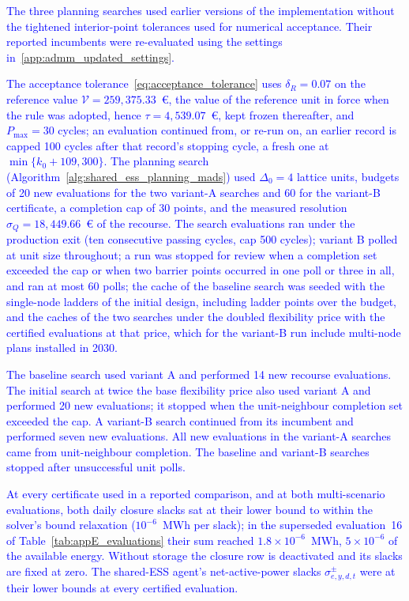 \documentclass[preprint,12pt]{elsarticle}
\begin{document}
\textcolor{blue}{
    The three planning searches used earlier versions of the implementation without the tightened interior-point tolerances used for numerical acceptance. Their reported incumbents were re-evaluated using the settings in~\ref{app:admm_updated_settings}.
}

\textcolor{blue}{
    The acceptance tolerance~\eqref{eq:acceptance_tolerance} uses $\delta_R = 0.07$ on the reference value $\mathcal{V} = 259{,}375.33$~\euro{}, the value of the reference unit in force when the rule was adopted, hence $\tau = 4{,}539.07$~\euro{}, kept frozen thereafter, and $P_{\max} = 30$ cycles;
    an evaluation continued from, or re-run on, an earlier record is capped 100 cycles after that record's stopping cycle, a fresh one at $\min\{k_0 + 109, 300\}$. The planning search (Algorithm~\ref{alg:shared_ess_planning_mads}) used $\Delta_0 = 4$ lattice units, budgets of 20 new evaluations for the two variant-A searches and 60 for the variant-B certificate, a completion cap of 30 points, and the measured resolution $\sigma_Q = 18{,}449.66$~\euro{} of the recourse.
    The search evaluations ran under the production exit (ten consecutive passing cycles, cap 500 cycles); variant B polled at unit size throughout; a run was stopped for review when a completion set exceeded the cap or when two barrier points occurred in one poll or three in all, and ran at most 60 polls; the cache of the baseline search was seeded with the single-node ladders of the initial design, including ladder points over the budget, and the caches of the two searches under the doubled flexibility price with the certified evaluations at that price, which for the variant-B run include multi-node plans installed in 2030.
}

\textcolor{blue}{
    The baseline search used variant A and performed 14 new recourse evaluations. The initial search at twice the base flexibility price also used variant A and performed 20 new evaluations; it stopped when the unit-neighbour completion set exceeded the cap. A variant-B search continued from its incumbent and performed seven new evaluations. All new evaluations in the variant-A searches came from unit-neighbour completion. The baseline and variant-B searches stopped after unsuccessful unit polls.
}

\textcolor{blue}{
    At every certificate used in a reported comparison, and at both multi-scenario evaluations, both daily closure slacks sat at their lower bound to within the solver's bound relaxation ($10^{-6}$~MWh per slack); in the superseded evaluation~16 of Table~\ref{tab:appE_evaluations} their sum reached $1.8 \times 10^{-6}$~MWh, $5 \times 10^{-6}$ of the available energy. Without storage the closure row is deactivated and its slacks are fixed at zero.
    The shared-ESS agent's net-active-power slacks $\sigma^\pm_{e,y,d,t}$ were at their lower bounds at every certified evaluation.
}
\end{document}

